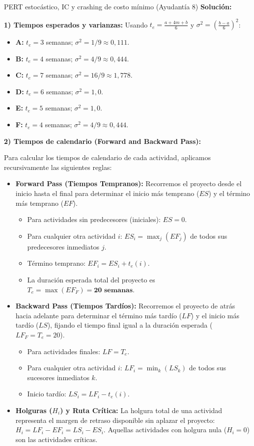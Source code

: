 \begin{ejercicio}{PERT estocástico, IC y crashing de costo mínimo (Ayudantía 8)}
\textbf{Solución:}

\textbf{1) Tiempos esperados y varianzas:}
Usando $t_e = \frac{a+4m+b}{6}$ y $\sigma^2 = \left(\frac{b-a}{6}\right)^2$:
\begin{itemize}
  \item \textbf{A:} $t_e = 3$ semanas; $\sigma^2 = 1/9 \approx 0,111$.
  \item \textbf{B:} $t_e = 4$ semanas; $\sigma^2 = 4/9 \approx 0,444$.
  \item \textbf{C:} $t_e = 7$ semanas; $\sigma^2 = 16/9 \approx 1,778$.
  \item \textbf{D:} $t_e = 6$ semanas; $\sigma^2 = 1,0$.
  \item \textbf{E:} $t_e = 5$ semanas; $\sigma^2 = 1,0$.
  \item \textbf{F:} $t_e = 4$ semanas; $\sigma^2 = 4/9 \approx 0,444$.
\end{itemize}

\textbf{2) Tiempos de calendario (Forward and Backward Pass):}

Para calcular los tiempos de calendario de cada actividad, aplicamos recursivamente las siguientes reglas:
\begin{itemize}
  \item \textbf{Forward Pass (Tiempos Tempranos):} Recorremos el proyecto desde el inicio hasta el final para determinar el inicio más temprano ($ES$) y el término más temprano ($EF$).
    \begin{itemize}
      \item Para actividades sin predecesores (iniciales): $ES = 0$.
      \item Para cualquier otra actividad $i$: $ES_i = \max_{j} (EF_j)$ de todos sus predecesores inmediatos $j$.
      \item Término temprano: $EF_i = ES_i + t_e(i)$.
      \item La duración esperada total del proyecto es $T_e = \max(EF_F) = \mathbf{20\text{ semanas}}$.
    \end{itemize}
  \item \textbf{Backward Pass (Tiempos Tardíos):} Recorremos el proyecto de atrás hacia adelante para determinar el término más tardío ($LF$) y el inicio más tardío ($LS$), fijando el tiempo final igual a la duración esperada ($LF_F = T_e = 20$).
    \begin{itemize}
      \item Para actividades finales: $LF = T_e$.
      \item Para cualquier otra actividad $i$: $LF_i = \min_{k} (LS_k)$ de todos sus sucesores inmediatos $k$.
      \item Inicio tardío: $LS_i = LF_i - t_e(i)$.
    \end{itemize}
  \item \textbf{Holguras ($H_i$) y Ruta Crítica:} La holgura total de una actividad representa el margen de retraso disponible sin aplazar el proyecto: $H_i = LF_i - EF_i = LS_i - ES_i$. Aquellas actividades con holgura nula ($H_i = 0$) son las actividades críticas.
\end{itemize}


\end{ejercicio}
